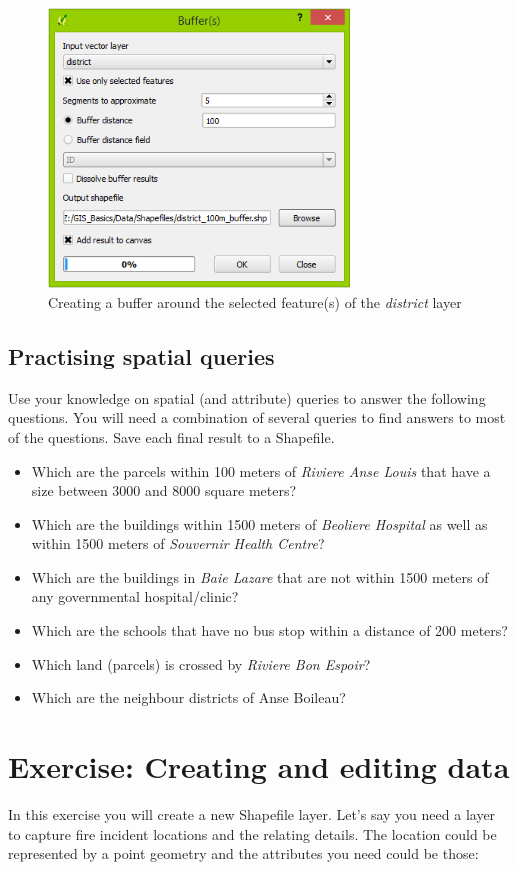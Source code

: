 \documentclass[a4paper,12pt,titlepage]{article}
\begin{document}
\begin{figure}[h]
\centering
\includegraphics[width=8cm]{Images/buffer.png}
\caption{Creating a buffer around the selected feature(s) of the \textit{district} layer}\label{fig:buffer}
\end{figure}

\subsection{Practising spatial queries}
Use your knowledge on spatial (and attribute) queries to answer the following questions. You will need a combination of several queries to find answers to most of the questions. Save each final result to a Shapefile.

\begin{itemize}
\item Which are the parcels within 100 meters of \textit{Riviere Anse Louis} that have a size  between 3000 and 8000 square meters?
\item Which are the buildings within 1500 meters of \textit{Beoliere Hospital} as well as within 1500 meters of \textit{Souvernir Health Centre}?
\item Which are the buildings in \textit{Baie Lazare} that are not within 1500 meters of any governmental hospital/clinic?
\item Which are the schools that have no bus stop within a distance of 200 meters?
\item Which land (parcels) is crossed by \textit{Riviere Bon Espoir}?
\item Which are the neighbour districts of Anse Boileau?
\end{itemize}


\section{Exercise: Creating and editing data}
In this exercise you will create a new Shapefile layer. Let's say you need a layer to capture fire incident locations and the relating details. The location could be represented by a point geometry and the attributes you need could be those:
\end{document}
